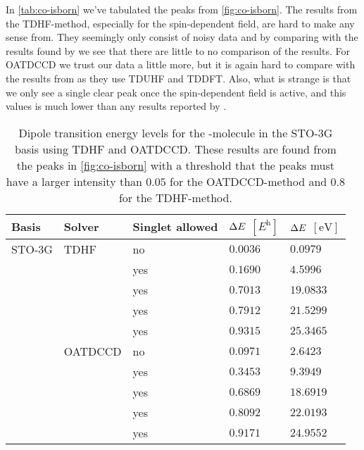         In \autoref{tab:co-isborn} we've tabulated the peaks from
        \autoref{fig:co-isborn}.
        The results from the TDHF-method, especially for the spin-dependent
        field, are hard to make any sense from.
        They seemingly only consist of noisy data and by comparing with the
        results found by \citeauthor{isborn} we see that there are little to no
        comparison of the results.
        For OATDCCD we trust our data a little more, but it is again hard to
        compare with the results from \citeauthor{isborn} as they use TDUHF and
        TDDFT.
        Also, what is strange is that we only see a single clear peak once the
        spin-dependent field is active, and this values is much lower than any
        results reported by \citeauthor{isborn}.
        \begin{table}
            \centering
            \caption{Dipole transition energy levels for the -molecule in
            the STO-3G basis using TDHF and OATDCCD.
            These results are found from the peaks in \autoref{fig:co-isborn}
            with a threshold that the peaks must have a larger intensity than
            $\num{0.05}$ for the OATDCCD-method and $\num{0.8}$ for the
            TDHF-method.}
            \renewcommand{\arraystretch}{1.3}
            \begin{tabular}{@{}lllll@{}}
                \toprule
                Basis & Solver & Singlet allowed
                & $\Delta E$ $[\si{\hartree}]$
                & $\Delta E$ $[\si{\electronvolt}]$
                \\
                \midrule
                STO-3G & TDHF & no & $0.0036$ & $0.0979$ \\
                & & yes & $0.1690$ & $4.5996$ \\
                & & yes & $0.7013$ & $19.0833$ \\
                & & yes & $0.7912$ & $21.5299$ \\
                & & yes & $0.9315$ & $25.3465$ \\
                & OATDCCD & no & $0.0971$ & $2.6423$ \\
                & & yes & $0.3453$ & $9.3949$ \\
                & & yes & $0.6869$ & $18.6919$ \\
                & & yes & $0.8092$ & $22.0193$ \\
                & & yes & $0.9171$ & $24.9552$ \\
                \bottomrule
            \end{tabular}
            \label{tab:co-isborn}
        \end{table}

